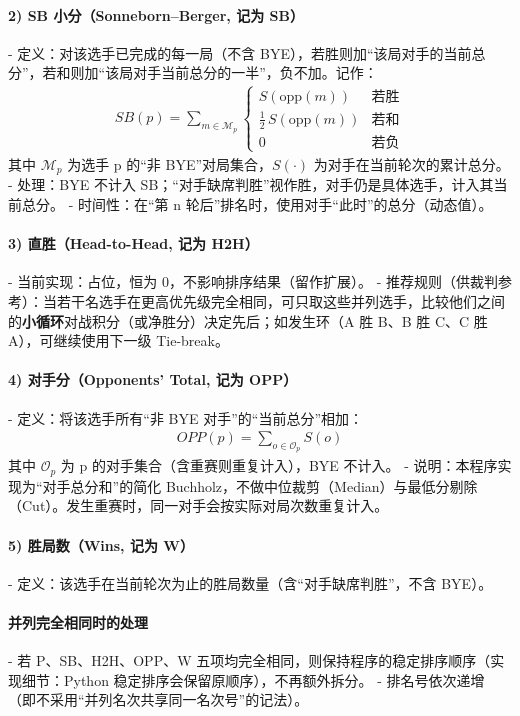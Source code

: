 \documentclass[12pt]{ctexart}
\begin{document}
\paragraph{2) SB 小分（Sonneborn–Berger, 记为 SB）}
- 定义：对该选手已完成的每一局（不含 BYE），若胜则加“该局对手的当前总分”，若和则加“该局对手当前总分的一半”，负不加。记作：
\[\begin{aligned}
SB(p)=\sum_{m\in \mathcal{M}_p}
\begin{cases}
S(\text{opp}(m)) & \text{若胜}\\[2pt]
\frac{1}{2}\,S(\text{opp}(m)) & \text{若和}\\[2pt]
0 & \text{若负}
\end{cases}
\end{aligned}\]
其中 \(\mathcal{M}_p\) 为选手 p 的“非 BYE”对局集合，\(S(\cdot)\) 为对手在当前轮次的累计总分。  
- 处理：BYE 不计入 SB；“对手缺席判胜”视作胜，对手仍是具体选手，计入其当前总分。  
- 时间性：在“第 n 轮后”排名时，使用对手“此时”的总分（动态值）。

\paragraph{3) 直胜（Head-to-Head, 记为 H2H）}
- 当前实现：占位，恒为 0，不影响排序结果（留作扩展）。  
- 推荐规则（供裁判参考）：当若干名选手在更高优先级完全相同，可只取这些并列选手，比较他们之间的\textbf{小循环}对战积分（或净胜分）决定先后；如发生环（A 胜 B、B 胜 C、C 胜 A），可继续使用下一级 Tie-break。

\paragraph{4) 对手分（Opponents’ Total, 记为 OPP）}
- 定义：将该选手所有“非 BYE 对手”的“当前总分”相加：
\[\begin{aligned}
OPP(p)=\sum_{o\in \mathcal{O}_p} S(o)
\end{aligned}\]
其中 \(\mathcal{O}_p\) 为 p 的对手集合（含重赛则重复计入），BYE 不计入。  
- 说明：本程序实现为“对手总分和”的简化 Buchholz，不做中位裁剪（Median）与最低分剔除（Cut）。发生重赛时，同一对手会按实际对局次数重复计入。

\paragraph{5) 胜局数（Wins, 记为 W）}
- 定义：该选手在当前轮次为止的胜局数量（含“对手缺席判胜”，不含 BYE）。

\paragraph{并列完全相同时的处理}
- 若 P、SB、H2H、OPP、W 五项均完全相同，则保持程序的稳定排序顺序（实现细节：Python 稳定排序会保留原顺序），不再额外拆分。  
- 排名号依次递增（即不采用“并列名次共享同一名次号”的记法）。
\end{document}
